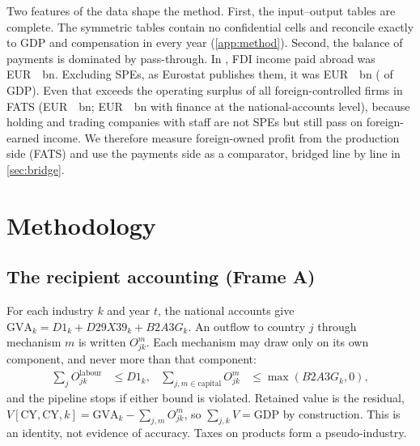 \documentclass[11pt]{article}
\newcommand{\EUR}{EUR~}
\begin{document}
Two features of the data shape the method.
First, the input--output tables are complete.
The symmetric tables contain no confidential cells and reconcile exactly to GDP and compensation in every year (\cref{app:method}).
Second, the balance of payments is dominated by pass-through.
In \LastYear{}, FDI income paid abroad was \EUR\TotalFDIPaidLastEUR~bn.
Excluding SPEs, as Eurostat publishes them, it was \EUR\NonSPEFDILastEUR~bn (\NonSPEFDILast{} of GDP).
Even that exceeds the operating surplus of all foreign-controlled firms in FATS (\EUR\FATSPublishedLast~bn; \EUR\FATSForeignGOSLast~bn with finance at the national-accounts level), because holding and trading companies with staff are not SPEs but still pass on foreign-earned income.
We therefore measure foreign-owned profit from the production side (FATS) and use the payments side as a comparator, bridged line by line in \cref{sec:bridge}.

\section{Methodology}
\label{sec:method}

\subsection{The recipient accounting (Frame A)}

For each industry $k$ and year $t$, the national accounts give $\text{GVA}_{k} = D1_{k} + D29X39_{k} + B2A3G_{k}$.
An outflow to country $j$ through mechanism $m$ is written $O^m_{jk}$.
Each mechanism may draw only on its own component, and never more than that component:
\begin{align}
\textstyle\sum_j O^{\text{labour}}_{jk} &\le D1_k, &
\textstyle\sum_{j,m\in\text{capital}} O^{m}_{jk} &\le \max(B2A3G_k,0),
\end{align}
and the pipeline stops if either bound is violated.
Retained value is the residual, $V[\text{CY},\text{CY},k] = \text{GVA}_k - \sum_{j,m} O^m_{jk}$, so $\sum_{j,k} V = \text{GDP}$ by construction.
This is an identity, not evidence of accuracy.
Taxes on products form a pseudo-industry.
\end{document}
